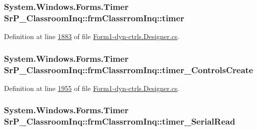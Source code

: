 \hypertarget{class_sr_p___classroom_inq_1_1frm_classrrom_inq_ac5fec0fdbc135ddcefc976786801ee05}{
\subsubsection[{timer}]{\setlength{\rightskip}{0pt plus 5cm}\-System.\-Windows.\-Forms.\-Timer {\bf \-Sr\-P\-\_\-\-Classroom\-Inq\-::frm\-Classrrom\-Inq\-::timer}}}
\label{class_sr_p___classroom_inq_1_1frm_classrrom_inq_ac5fec0fdbc135ddcefc976786801ee05}


\-Definition at line \hyperlink{_form1-dyn-ctrls_8_designer_8cs_source_l01883}{1883} of file \hyperlink{_form1-dyn-ctrls_8_designer_8cs_source}{\-Form1-\/dyn-\/ctrls.\-Designer.\-cs}.

\hypertarget{class_sr_p___classroom_inq_1_1frm_classrrom_inq_aa53f33f4a7245799242c52b4ceff8dab}{
\subsubsection[{timer\-\_\-\-Controls\-Create}]{\setlength{\rightskip}{0pt plus 5cm}\-System.\-Windows.\-Forms.\-Timer {\bf \-Sr\-P\-\_\-\-Classroom\-Inq\-::frm\-Classrrom\-Inq\-::timer\-\_\-\-Controls\-Create}}}
\label{class_sr_p___classroom_inq_1_1frm_classrrom_inq_aa53f33f4a7245799242c52b4ceff8dab}


\-Definition at line \hyperlink{_form1-dyn-ctrls_8_designer_8cs_source_l01955}{1955} of file \hyperlink{_form1-dyn-ctrls_8_designer_8cs_source}{\-Form1-\/dyn-\/ctrls.\-Designer.\-cs}.

\hypertarget{class_sr_p___classroom_inq_1_1frm_classrrom_inq_ae222e5fb7d4ed8ef65c9c3ff836cecf6}{
\subsubsection[{timer\-\_\-\-Serial\-Read}]{\setlength{\rightskip}{0pt plus 5cm}\-System.\-Windows.\-Forms.\-Timer {\bf \-Sr\-P\-\_\-\-Classroom\-Inq\-::frm\-Classrrom\-Inq\-::timer\-\_\-\-Serial\-Read}}}
\label{class_sr_p___classroom_inq_1_1frm_classrrom_inq_ae222e5fb7d4ed8ef65c9c3ff836cecf6}


